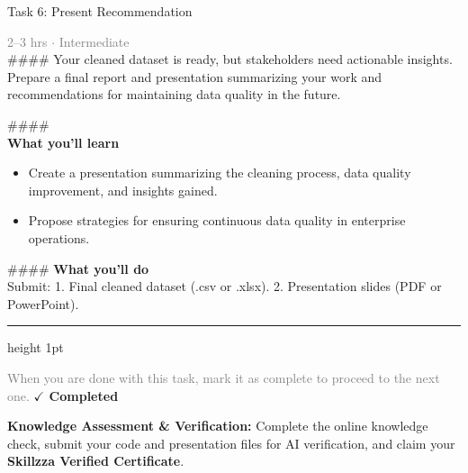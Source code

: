 \documentclass[10pt,a4paper]{article}
\begin{document}
\begin{taskbox}{Task 6: Present Recommendation}

    {\small \textcolor{gray}{2--3 hrs $\cdot$ Intermediate}}\\[12pt]

    \#\#\#\#   
Your cleaned dataset is ready, but stakeholders need actionable insights. Prepare a final report and presentation summarizing your work and recommendations for maintaining data quality in the future.

\#\#\#\# \\[10pt]
\vspace{8pt}
{\large \textbf{\textcolor{brandLight}{What you'll learn}}}\\[4pt]  
\begin{itemize}
    \item Create a presentation summarizing the cleaning process, data quality improvement, and insights gained.  
    \item Propose strategies for ensuring continuous data quality in enterprise operations.
\end{itemize}

\#\#\#\# \vspace{8pt}
{\large \textbf{\textcolor{brandLight}{What you'll do}}}\\[4pt]  
Submit:  
1. Final cleaned dataset (.csv or .xlsx).  
2. Presentation slides (PDF or PowerPoint).\par

    \vspace{16pt}

    \textcolor{cardBorder}{\hrule height 1pt}\vspace{8pt}

    \small \textcolor{gray}{When you are done with this task, mark it as complete to proceed to the next one.} \hfill \textbf{\textcolor{brandDark}{$\checkmark$ Completed}}

\end{taskbox}

\begin{completionbox}
    \textbf{Knowledge Assessment \& Verification:} Complete the online knowledge check, submit your code and presentation files for AI verification, and claim your \textbf{Skillzza Verified Certificate}.
\end{completionbox}

\newpage

\end{document}
